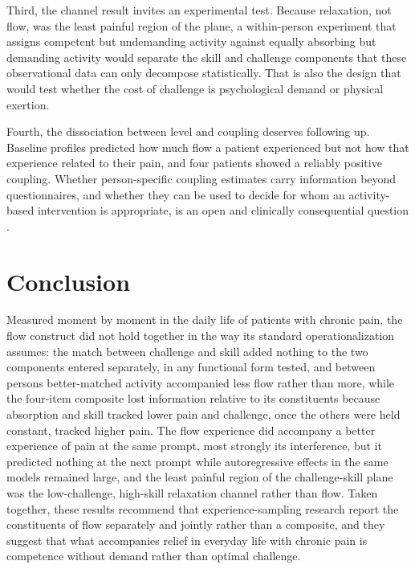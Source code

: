 \documentclass[11pt,a4paper]{article}
\begin{document}
Third, the channel result invites an experimental test. Because relaxation, not flow, was the least
painful region of the plane, a within-person experiment that assigns competent but undemanding
activity against equally absorbing but demanding activity would separate the skill and challenge
components that these observational data can only decompose statistically. That is also the design
that would test whether the cost of challenge is psychological demand or physical exertion.

Fourth, the dissociation between level and coupling deserves following up. Baseline profiles
predicted how much flow a patient experienced but not how that experience related to their pain,
and four patients showed a reliably positive coupling. Whether person-specific coupling estimates
carry information beyond questionnaires, and whether they can be used to decide for whom an
activity-based intervention is appropriate, is an open and clinically consequential question
\citep{wright2020personalized}.

\section{Conclusion}
Measured moment by moment in the daily life of patients with chronic pain, the flow construct did
not hold together in the way its standard operationalization assumes: the match between challenge
and skill added nothing to the two components entered separately, in any functional form tested,
and between persons better-matched activity accompanied less flow rather than more, while the
four-item composite lost information relative to its constituents because absorption and skill
tracked lower pain and challenge, once the others were held constant, tracked higher pain. The
flow experience did accompany a better experience of pain at the same prompt, most strongly its
interference, but it predicted nothing at the next prompt while autoregressive effects in the same
models remained large, and the least painful region of the challenge-skill plane was the
low-challenge, high-skill relaxation channel rather than flow. Taken together, these results
recommend that experience-sampling research report the constituents of flow separately and jointly
rather than a composite, and they suggest that what accompanies relief in everyday life with
chronic pain is competence without demand rather than optimal challenge.

\clearpage


\end{document}
